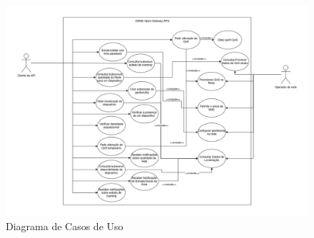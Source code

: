 \begin{figure}[H] \centerline{
		\includegraphics[width=20cm]{figs/use_case_diagram.png} } \caption{Diagrama de
		Casos de Uso} \end{figure}

